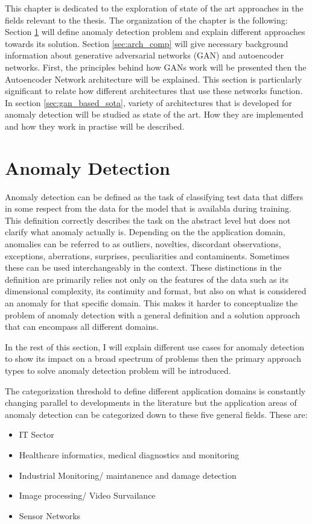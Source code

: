 \begingroup

This chapter is dedicated to the exploration of state of the art approaches in the fields relevant
to the thesis. The organization of the chapter is the following: Section \ref{sec:ad} will define
anomaly detection problem and explain different approaches towards its solution.  Section \ref{sec:arch_comp} will give
necessary background information about generative adversarial networks (GAN) and autoencoder
networks. First, the principles behind how GANs work will be presented then the Autoencoder Network
architecture will be explained. This section is particularly significant to relate how different
architectures that use these networks function. In section \ref{sec:gan_based_sota}, variety of architectures that is
developed for anomaly detection will be studied as state of the art. How they are implemented and
how they work in practise will be described.

\section{Anomaly Detection}
\label{sec:ad}
Anomaly detection can be defined as the task of classifying test data that differs in some respect 
from the data for the model that is availabla during training. \cite{Pimentel:2014:RRN:2588908.2589196} 
This definition correctly describes the task on the abstract level but does not clarify what anomaly 
actually is. Depending on the the application domain, anomalies can be referred to as outliers, 
novelties, discordant observations, exceptions, aberrations, surprises, peculiarities and
contaminents.\cite{Chandola:2009:ADS:1541880.1541882} Sometimes these can be used interchangeably in
the context. These distinctions in the definition are primarily relies not only on the features of
the data such as its dimensional complexity, its continuity and format, but also on what is
considered an anomaly for that specific domain. This makes it harder to conceptualize the problem of
anomaly detection with a general definition and a solution approach that can encompass all different
domains.

In the rest of this section, I will explain different use cases for anomaly detection to show its
impact on a broad spectrum of problems then the primary approach types to solve anomaly detection
problem will be introduced.

The categorization threshold to define different application domains is constantly changing 
parallel to developments in the literature but the application areas of 
anomaly detection can be categorized down to these five general fields.
\cite{Pimentel:2014:RRN:2588908.2589196}
These are:
\begin{itemize}
    \item IT Sector 
    \item Healthcare informatics, medical diagnostics and monitoring
    \item Industrial Monitoring/ maintanence and damage detection
    \item Image processing/ Video Survailance
    \item Sensor Networks
\end{itemize}

